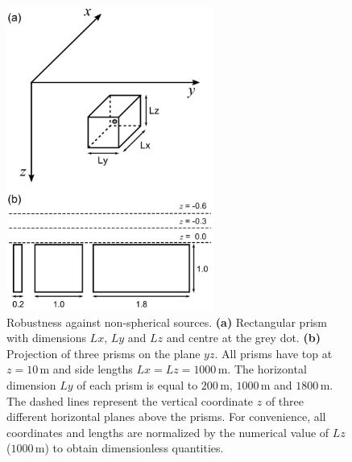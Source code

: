 \documentclass[journal abbreviation, npg]{copernicus}
\begin{document}
\begin{figure}[t]
\includegraphics[width=68mm]{Figures/npgd-2014-0069-f04}
\caption{Robustness against non-spherical sources. \textbf{(a)} Rectangular
  prism with dimensions $Lx$, $Ly$ and $Lz$ and centre at the grey dot. \textbf{(b)}
  Projection of three prisms on the plane $yz$. All prisms have top at
  $z=10$\,\unit{m} and side lengths $Lx=Lz=1000$\,\unit{m}. The
  horizontal dimension $Ly$ of each prism is equal to $200$\,\unit{m},
  $1000$\,\unit{m} and $1800$\,\unit{m}. The dashed lines represent
  the vertical coordinate $z$ of three different horizontal planes
  above the prisms. For convenience, all coordinates and lengths are
  normalized by the numerical value of $Lz$ ($1000$\,\unit{m}) to
  obtain dimensionless quantities.}
\label{fig:robust-shape-methodology}
\end{figure}
\end{document}

